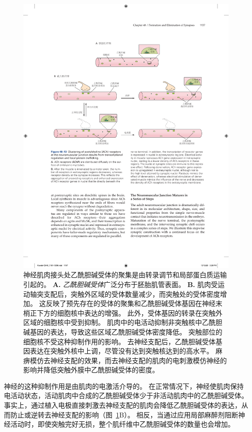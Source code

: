 \begin{figure}[htbp]
	\centering
	\includegraphics[width=1.0\linewidth]{chap48/fig_48_13}
	\caption{神经肌肉接头处乙酰胆碱受体的聚集是由转录调节和局部蛋白质运输引起的。
		\textbf{A.} \textit{乙酰胆碱受体}广泛分布于胚胎肌管表面。
		\textbf{B.} 肌肉受运动轴突支配后，突触外区域的受体数量减少，而突触处的受体密度增加。
		这反映了预先存在的受体的聚集和乙酰胆碱受体基因在神经末梢正下方的细胞核中表达的增强。
		此外，受体基因的转录在突触外区域的细胞核中受到抑制。
		肌肉中的电活动抑制非突触核中乙酰胆碱基因的表达，导致这些区域乙酰胆碱受体密度降低。
		突触部位的细胞核不受这种抑制作用的影响。
		去神经支配后，乙酰胆碱受体基因表达在突触外核中上调，尽管没有达到突触核达到的高水平。
		麻痹模仿去神经支配的效果，而去神经支配的肌肉的电刺激模仿神经的影响并降低突触外膜中乙酰胆碱受体的密度。}
	\label{fig:48_13}
\end{figure}


神经的这种抑制作用是由肌肉的电激活介导的。
在正常情况下，神经使肌肉保持电活动状态，活动肌肉中合成的乙酰胆碱受体少于非活动肌肉中的乙酰胆碱受体。
事实上，通过植入电极直接刺激去神经支配的肌肉会降低乙酰胆碱受体的表达，从而防止或逆转去神经支配的影响（图~\ref{fig:48_13}B）。
相反，当通过应用局部麻醉剂阻断神经活动时，即使突触完好无损，整个肌纤维中乙酰胆碱受体的数量也会增加。


